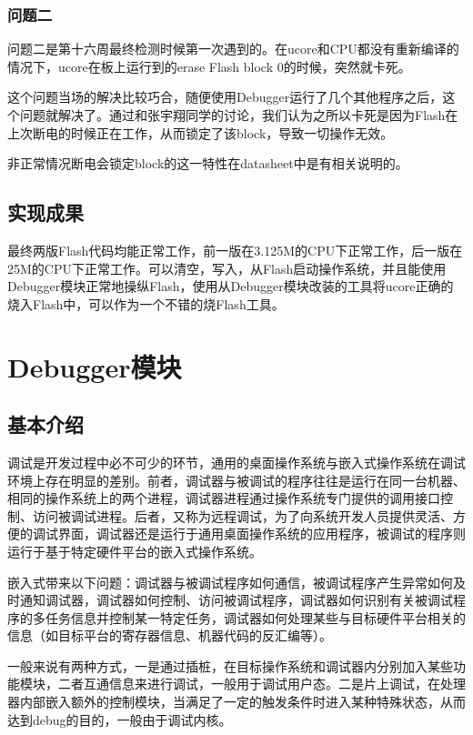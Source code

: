 \subsubsection{问题二}
问题二是第十六周最终检测时候第一次遇到的。在ucore和CPU都没有重新编译的情况下，ucore在板上运行到的erase Flash block 0的时候，突然就卡死。

这个问题当场的解决比较巧合，随便使用Debugger运行了几个其他程序之后，这个问题就解决了。通过和张宇翔同学的讨论，我们认为之所以卡死是因为Flash在上次断电的时候正在工作，从而锁定了该block，导致一切操作无效。

非正常情况断电会锁定block的这一特性在datasheet中是有相关说明的。


\subsection{实现成果}
最终两版Flash代码均能正常工作，前一版在3.125M的CPU下正常工作，后一版在25M的CPU下正常工作。可以清空，写入，从Flash启动操作系统，并且能使用Debugger模块正常地操纵Flash，使用从Debugger模块改装的工具将ucore正确的烧入Flash中，可以作为一个不错的烧Flash工具。




\section{Debugger模块}
\subsection{基本介绍}
调试是开发过程中必不可少的环节，通用的桌面操作系统与嵌入式操作系统在调试环境上存在明显的差别。前者，调试器与被调试的程序往往是运行在同一台机器、相同的操作系统上的两个进程，调试器进程通过操作系统专门提供的调用接口控制、访问被调试进程。后者，又称为远程调试，为了向系统开发人员提供灵活、方便的调试界面，调试器还是运行于通用桌面操作系统的应用程序，被调试的程序则运行于基于特定硬件平台的嵌入式操作系统。

嵌入式带来以下问题：调试器与被调试程序如何通信，被调试程序产生异常如何及时通知调试器，调试器如何控制、访问被调试程序，调试器如何识别有关被调试程序的多任务信息并控制某一特定任务，调试器如何处理某些与目标硬件平台相关的信息（如目标平台的寄存器信息、机器代码的反汇编等）。

一般来说有两种方式，一是通过插桩，在目标操作系统和调试器内分别加入某些功能模块，二者互通信息来进行调试，一般用于调试用户态。二是片上调试，在处理器内部嵌入额外的控制模块，当满足了一定的触发条件时进入某种特殊状态，从而达到debug的目的，一般由于调试内核。

